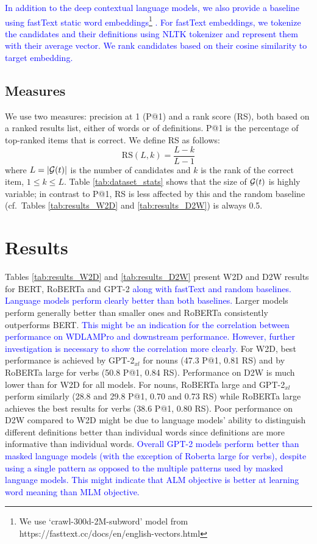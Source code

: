 \documentclass[11pt,a4paper]{article}
\begin{document}
\textcolor{blue}{In addition to the deep contextual language models, we also provide a baseline using fastText static word embeddings\footnote{We use `crawl-300d-2M-subword' model from https://fasttext.cc/docs/en/english-vectors.html} \cite{mikolov18fastText}. For fastText embeddings, we tokenize the candidates and their definitions using NLTK tokenizer and represent them with their average vector. We rank candidates based on their cosine similarity to target embedding. }
%

\subsection{Measures}
We use two measures: precision at 1 (P@1) and a rank score
(RS), both based on a ranked results list, either of words
or of definitions. P@1 is the percentage of top-ranked items
that is correct.
We define RS as follows:  
\begin{equation*}
    \text{RS}(L,k) = \frac{L-k}{L-1}
\end{equation*}
where $L=|{\cal G}(t)|$ is the number of candidates  and
$k$ is the rank of the correct item, $1 \leq k \leq L$.
Table \ref{tab:dataset_stats} shows that the size of ${\cal G}(t)$
is highly variable;
in contrast to P@1, RS is less affected by
this and the random baseline (cf.\ Tables
\ref{tab:results_W2D}
and \ref{tab:results_D2W}) is always 0.5.  

\section{Results}

Tables \ref{tab:results_W2D} and 
\ref{tab:results_D2W} present
W2D and D2W
results for
BERT, RoBERTa and GPT-2 \textcolor{blue}{along with fastText and random baselines. Language models perform clearly better than both baselines.}
Larger models perform generally better than smaller
ones and RoBERTa consistently outperforms BERT.
\textcolor{blue}{This might be an indication for the correlation between performance on WDLAMPro and downstream performance. However, further investigation is necessary to show the correlation more clearly.}
For W2D, best performance is achieved by GPT-2$_{xl}$  for nouns (47.3 P@1, 0.81 RS) and by RoBERTa large for  verbs (50.8 P@1, 0.84 RS). 
Performance on D2W is much lower than for W2D for all models. 
For nouns, RoBERTa large and GPT-2$_{xl}$ perform similarly (28.8 and 29.8 P@1, 0.70 and 0.73 RS) while RoBERTa large achieves the best results for verbs (38.6 P@1, 0.80 RS).
Poor performance on D2W compared to W2D might be due to language models' ability to distinguish different definitions better than individual words since definitions are more informative  than individual words. 
\textcolor{blue}{Overall GPT-2 models perform better than masked language models (with the exception of Roberta large for verbs), despite using a single pattern as opposed to the multiple patterns used by masked language models. This might indicate that ALM objective is better at learning word meaning than MLM objective. }
\end{document}
